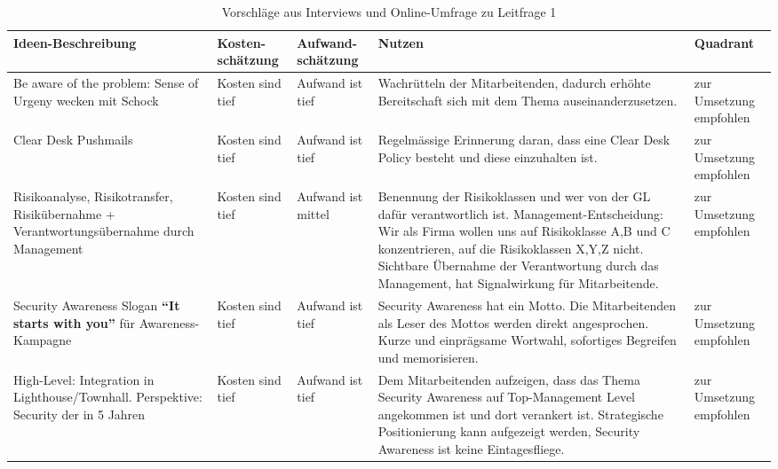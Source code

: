 \documentclass[../../main.tex]{subfiles}
\begin{document}
\begin{table}[H]
\tablefontsize	
\centering
\caption{Vorschläge aus Interviews und Online-Umfrage zu Leitfrage 1}
\label{vorschlaege_leitfrage1}
\begin{tabular}{ |p{3.8cm}|p{2.5cm}|p{2.5cm}|p{3.8cm}|p{3.0cm}|}

\hline
\tableheaderbgcolor
\textbf{Ideen-Beschreibung} & \textbf{Kosten-\newline schätzung} & \textbf{Aufwand-\newline schätzung} & \textbf{Nutzen} & \textbf{Quadrant}\\ 

\hline
Be aware of the problem: Sense of Urgeny wecken mit Schock &  Kosten sind tief &  Aufwand ist tief  & Wachrütteln der Mitarbeitenden, dadurch erhöhte Bereitschaft sich mit dem Thema auseinanderzusetzen. & zur Umsetzung empfohlen\\
\hline
Clear Desk Pushmails &  Kosten sind tief &  Aufwand ist tief  & Regelmässige Erinnerung daran, dass eine Clear Desk Policy besteht und diese einzuhalten ist.  & zur Umsetzung empfohlen\\
\hline
Risikoanalyse, Risikotransfer, Risikübernahme + Verantwortungsübernahme durch Management &  Kosten sind tief &  Aufwand ist mittel  & Benennung der Risikoklassen und wer von der GL dafür verantwortlich ist. Management-Entscheidung: Wir als Firma wollen uns auf Risikoklasse A,B und C konzentrieren, auf die Risikoklassen X,Y,Z nicht. Sichtbare Übernahme der Verantwortung durch das Management, hat Signalwirkung für Mitarbeitende. & zur Umsetzung empfohlen\\
\hline
Security Awareness Slogan \newline \textbf{"`It starts with you"'} \newline für Awareness-Kampagne &  Kosten sind tief &  Aufwand ist tief  & Security Awareness hat ein Motto. Die Mitarbeitenden als Leser des Mottos werden direkt angesprochen. Kurze und einprägsame Wortwahl, sofortiges Begreifen und memorisieren. & zur Umsetzung empfohlen\\
\hline
High-Level: Integration in Lighthouse/Townhall. Perspektive: Security der \companyshort{} in 5 Jahren &  Kosten sind tief &  Aufwand ist tief  & Dem Mitarbeitenden aufzeigen, dass das Thema Security Awareness auf Top-Management Level angekommen ist und dort verankert ist. Strategische Positionierung kann aufgezeigt werden, Security Awareness ist keine Eintagesfliege.& zur Umsetzung empfohlen\\
\hline

\end{tabular}
\end{table}
\end{document}
